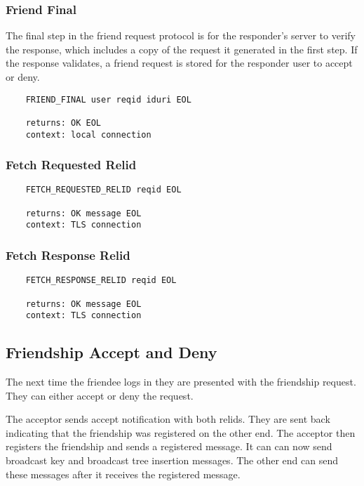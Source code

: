 \documentclass[letterpaper,11pt,oneside]{article}
\begin{document}
\subsubsection{Friend Final}

The final step in the friend request protocol is for the responder's server to
verify the response, which includes a copy of the request it generated in the
first step. If the response validates, a friend request is stored for the
responder user to accept or deny.

\vspace{10pt}
\begin{verbatim}
    FRIEND_FINAL user reqid iduri EOL

    returns: OK EOL
    context: local connection
\end{verbatim}
\vspace{10pt}

\subsubsection{Fetch Requested Relid}

\vspace{10pt}
\begin{verbatim}
    FETCH_REQUESTED_RELID reqid EOL

    returns: OK message EOL
    context: TLS connection
\end{verbatim}
\vspace{10pt}

\subsubsection{Fetch Response Relid}

\vspace{10pt}
\begin{verbatim}
    FETCH_RESPONSE_RELID reqid EOL

    returns: OK message EOL
    context: TLS connection
\end{verbatim}

\subsection{Friendship Accept and Deny}

The next time the friendee logs in they are presented with the friendship
request. They can either accept or deny the request. 

The acceptor sends accept notification with both relids. They are sent back
indicating that the friendship was registered on the other end. The acceptor
then registers the friendship and sends a registered message. It can can now
send broadcast key and broadcast tree insertion messages. The other end can
send these messages after it receives the registered message.
\end{document}
